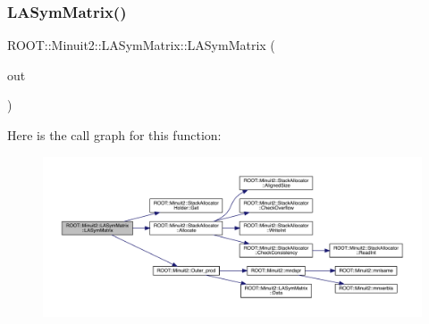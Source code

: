 \subsubsection{\texorpdfstring{LASymMatrix()}{LASymMatrix()}\hspace{0.1cm}{\footnotesize\ttfamily [9/30]}}
{\footnotesize\ttfamily R\+O\+O\+T\+::\+Minuit2\+::\+L\+A\+Sym\+Matrix\+::\+L\+A\+Sym\+Matrix (\begin{DoxyParamCaption}\item[{const \mbox{\hyperlink{classROOT_1_1Minuit2_1_1ABObj}{A\+B\+Obj}}$<$ \mbox{\hyperlink{classROOT_1_1Minuit2_1_1sym}{sym}}, \mbox{\hyperlink{classROOT_1_1Minuit2_1_1VectorOuterProduct}{Vector\+Outer\+Product}}$<$ \mbox{\hyperlink{classROOT_1_1Minuit2_1_1ABObj}{A\+B\+Obj}}$<$ \mbox{\hyperlink{classROOT_1_1Minuit2_1_1vec}{vec}}, \mbox{\hyperlink{classROOT_1_1Minuit2_1_1LAVector}{L\+A\+Vector}}, double $>$, double $>$, double $>$ \&}]{out }\end{DoxyParamCaption})}

Here is the call graph for this function\+:
\nopagebreak
\begin{figure}[H]
\begin{center}
\leavevmode
\includegraphics[width=350pt]{d3/d72/classROOT_1_1Minuit2_1_1LASymMatrix_ab3813da18be7a37100a8f9c7cd49caf3_cgraph}
\end{center}
\end{figure}
\mbox{\label{classROOT_1_1Minuit2_1_1LASymMatrix_aed0e1071ce94c05d4b18e7594db9a249}} 

